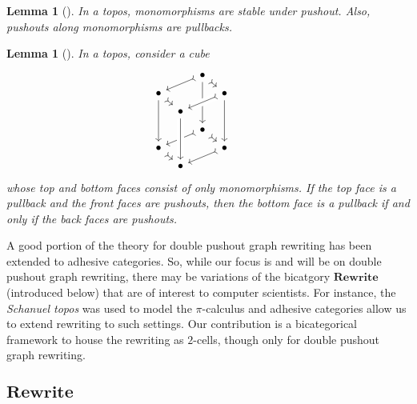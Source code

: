 \documentclass[11pt]{amsart}
\newcommand{\cat}[1]{\mathbf{#1}}
\newtheorem{lem}[thm]{Lemma}
\theoremstyle{remark}
\theoremstyle{definition}
\begin{document}
\begin{lem}[{\cite[Lemmas 
		4.2-3]{LackSoboc_AdhesiveCategories}}]
	\label{lem.adhesive properties}
	In a topos, monomorphisms are stable under 	pushout. Also, pushouts along monomorphisms 
	are pullbacks.
\end{lem}
%
%
%
%
%
%

\begin{lem}[{\cite[Lemma 
		6.3]{LackSoboc_AdhesiveCategories}}] 
	\label{lem.vk dual}
	In a topos, consider a cube
	\[
	\begin{tikzcd}[column sep=tiny,row sep=tiny]
	{} & 
	{} & 
	{\bullet} 
	\ar[ddd]
	\ar[rd,rightarrowtail] 
	\ar[lld,rightarrowtail] &
	{} \\ 
	{\bullet}
	\ar[rd,rightarrowtail]
	\ar[ddd] &
	{} & 
	{} &
	{\bullet} 
	\ar[ddd] 
	\ar[lld,rightarrowtail,crossing over] 
	\\ 
	{} & 
	{\bullet} &
	{} & 
	{} \\
	{} &
	{} &
	{\bullet} 
	\ar[dr,rightarrowtail] 
	\ar[lld,rightarrowtail] &
	{} \\
	{\bullet} 
	\ar[rd,rightarrowtail] &
	{} &
	{} &
	{\bullet} 
	\ar[lld,rightarrowtail] \\
	{} &
	{\bullet} &
	{} & 
	{} &
	{} &
	\ar[from=3-2,to=6-2,crossing over]
	\end{tikzcd}
	\]
	whose top and bottom faces consist of only monomorphisms. If the top face is a pullback 
	and the front faces are pushouts, then the bottom face is a pullback if and only if the 
	back faces are pushouts.
\end{lem}

A good portion of the theory for double pushout graph rewriting has been extended to adhesive categories. So, while our focus is and will be on double pushout graph rewriting, there may be variations of the bicatgory $\cat{Rewrite}$ (introduced below) that are of interest to computer scientists.  For instance, the \emph{Schanuel topos} was used to model the $\pi$-calculus \cite{Fiore_OpModelsProcessCalulii} and adhesive categories allow  us to extend rewriting to such settings.  Our contribution is a bicategorical framework to house the rewriting as $2$-cells, though only for double pushout graph rewriting.

\subsection{$\cat{Rewrite}$}  %
\label{sec.Rewrite}
\end{document}
